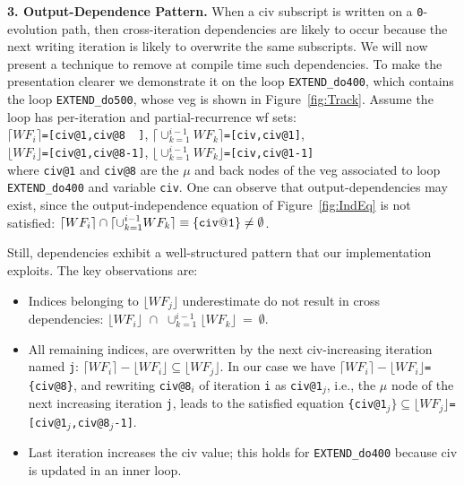 \documentclass[10pt,nocopyrightspace]{sigplanconf}
\begin{document}
{\bf 3. Output-Dependence Pattern.} 
%
When a {\sc civ} subscript is written on a {\tt 0}-evolution path,
then cross-iteration dependencies are likely to occur because 
the next writing iteration is likely to overwrite the same subscripts.
We will now present a technique to remove at compile time such dependencies.
To make the presentation clearer we demonstrate it on the loop {\tt EXTEND\_do400},
which contains the loop {\tt EXTEND\_do500}, whose {\sc veg} is shown 
in Figure~\ref{fig:Track}.
%
Assume the loop has per-iteration and partial-recurrence {\sc wf} 
sets:\vspace{1ex}\\
\noindent$\lceil WF_i\rceil${\tt=[civ@1,civ@8~~]},
$\lceil\cup_{k=1}^{i-1}WF_{k} \rceil${\tt=[civ,civ@1]},\\
\noindent$\lfloor WF_i\rfloor${\tt=[civ@1,civ@8-1]},
$\lfloor\cup_{k=1}^{i-1}WF_k \rfloor${\tt=[civ,civ@1-1]}\vspace{1ex}\\
where {\tt civ@1} and {\tt civ@8} are the $\mu$ and back nodes of
the {\sc veg} associated to loop {\tt EXTEND\_do400} and variable {\tt civ}.
%
One can observe that output-dependencies may exist, since
the output-independence equation of Figure~\ref{fig:IndEq} is not satisfied:
$\lceil WF_{i}\rceil \cap \lceil \cup_{k=1}^{i-1}WF_{k} \rceil \equiv {\tt\{civ@1\}}\ne\emptyset$.

Still, dependencies exhibit a well-structured pattern that our 
implementation exploits. The key observations are: 
\begin{itemize}
    \item Indices belonging to $\lfloor{}WF_{j}\rfloor$ underestimate  
            do not result in cross dependencies:
        $\lfloor WF_{i}\rfloor\mbox{~}\cap\mbox{~}\cup_{k=1}^{i-1}\lfloor WF_{k}\rfloor~=~\emptyset$.

    \item All remaining indices, are overwritten by the next 
            {\sc civ}-increasing iteration named {\tt j}: 
        $\lceil WF_{i}\rceil - \lfloor WF_{i}\rfloor \subseteq \lfloor WF_{j} \rfloor$. %
        In our case we have $\lceil WF_{i}\rceil - \lfloor WF_{i}\rfloor${\tt=\{civ@8\}},
        and rewriting {\tt civ@8$_i$} of iteration {\tt i} as {\tt civ@1$_j$}, i.e.,
        the $\mu$ node of the next increasing iteration {\tt j}, leads to the
        satisfied equation {\tt \{civ@1$_j\}\subseteq \lfloor WF_{j}\rfloor$=[civ@1$_j$,civ@8$_j$-1]}. 

    \item Last iteration increases the {\sc civ} value; this 
        holds for {\tt EXTEND\_do400} because {\sc civ} is 
        updated in an inner loop.
\end{itemize}
\end{document}
